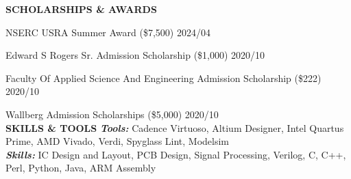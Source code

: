 \documentclass[11pt]{article}
\begin{document}
\vspace{0.15in}


{\noindent \bfseries SCHOLARSHIPS \& AWARDS}
\vspace{0.05in}
\hline

\vspace{0.1in}

\noindent
{NSERC USRA Summer Award (\$7,500)} \hfill 2024/04
\vspace{0.05in}

\noindent
{Edward S Rogers Sr. Admission Scholarship (\$1,000)} \hfill 2020/10 
\vspace{0.05in}

\noindent
{Faculty Of Applied Science And Engineering Admission Scholarship (\$222)} \hfill 2020/10 
\vspace{0.05in}

\noindent
{Wallberg Admission Scholarships (\$5,000)} \hfill 2020/10 
\vspace{0.15in}
\\

{\noindent \bfseries SKILLS \& TOOLS}
\vspace{0.05in}
\hline
\vspace{0.1in}
\noindent
{\sl \bfseries Tools:} Cadence Virtuoso, Altium Designer, Intel Quartus Prime, AMD Vivado, Verdi, Spyglass Lint, Modelsim\\
{\sl \bfseries Skills:} IC Design and Layout, PCB Design, Signal Processing, Verilog, C, C++, Perl, Python, Java, ARM Assembly
\end{document}
